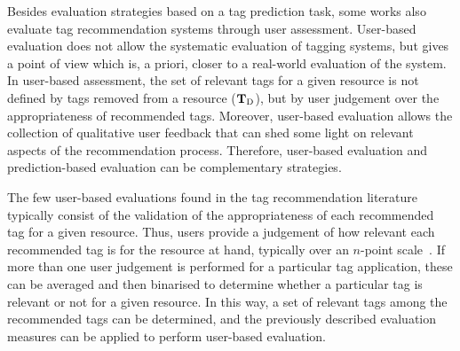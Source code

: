 
Besides evaluation strategies based on a tag prediction task, some works also evaluate tag recommendation systems through user assessment.
User-based evaluation does not allow the systematic evaluation of tagging systems, but gives a point of view which is, a priori, closer to a real-world evaluation of the system. In user-based assessment, the set of relevant tags for a given resource is not defined by tags removed from a resource ($\mathbf{T}_{\text{D}}$), but by user judgement over the appropriateness of recommended tags. Moreover, user-based evaluation allows the collection of qualitative user feedback that can shed some light on relevant aspects of the recommendation process. Therefore, user-based evaluation and prediction-based evaluation can be complementary strategies.

The few user-based evaluations found in the tag recommendation literature typically consist of the validation of the appropriateness of each recommended tag for a given resource. Thus, users provide a judgement of how relevant each recommended tag is for the resource at hand, typically over an $n$-point scale~\citep[see e.g.,][]{Sigurbjornsson2008, meo2009}. If more than one user judgement is performed for a particular tag application, these can be averaged and then binarised to determine whether a particular tag is relevant or not for a given resource. In this way, a set of relevant tags among the recommended tags can be determined, and the previously described evaluation measures can be applied to perform user-based evaluation.

